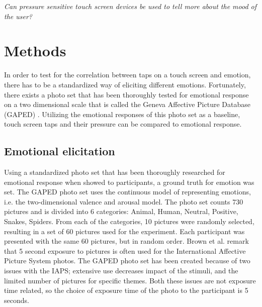 \documentclass{sig-alternate}
\begin{document}
\textit{Can pressure sensitive touch screen devices be used to tell more about the mood of the user?}\\


\section{Methods} %
\label{sec:methods}
In order to test for the correlation between taps on a touch screen and emotion, there has to be a standardized way of eliciting different emotions. Fortunately, there exists a photo set that has been thoroughly tested for emotional response on a two dimensional scale that is called the Geneva Affective Picture Database (GAPED) \cite{Dan-glauser2011}. Utilizing the emotional responses of this photo set as a baseline, touch screen taps and their pressure can be compared to emotional response.

\subsection{Emotional elicitation} %
\label{sub:emotional_elicitation}
Using a standardized photo set that has been thoroughly researched for emotional response when showed to participants, a ground truth for emotion was set. The GAPED photo set uses the continuous model of representing emotions, i.e. the two-dimensional valence and arousal model. The photo set counts 730 pictures and is divided into 6 categories: Animal, Human, Neutral, Positive, Snakes, Spiders. From each of the categories, 10 pictures were randomly selected, resulting in a set of 60 pictures used for the experiment. Each participant was presented with the same 60 pictures, but in random order.
Brown et al. \cite{Neuroscience2012} remark that 5 second exposure to pictures is often used for the International Affective Picture System photos. The GAPED photo set has been created because of two issues with the IAPS; extensive use decreases impact of the stimuli, and the limited number of pictures for specific themes. Both these issues are not exposure time related, so the choice of exposure time of the photo to the participant is 5 seconds.
\end{document}
